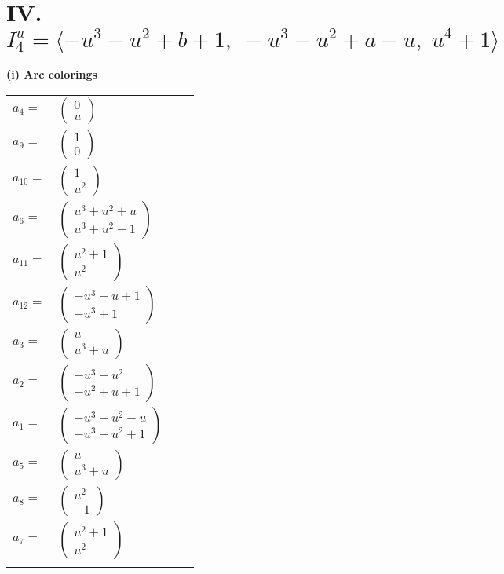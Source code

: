 \documentclass[1p]{elsarticle_modified}
\theoremstyle{definition}
\begin{document}
\centering \section*{IV. $I^u_{4}= \langle - u^3- u^2+b+1,\;- u^3- u^2+a- u,\;u^4+1 \rangle$}
\flushleft \textbf{(i) Arc colorings}\\
\begin{tabular}{m{7pt} m{180pt} m{7pt} m{180pt} }
\flushright $a_{4}=$&$\begin{pmatrix}0\\u\end{pmatrix}$ \\
\flushright $a_{9}=$&$\begin{pmatrix}1\\0\end{pmatrix}$ \\
\flushright $a_{10}=$&$\begin{pmatrix}1\\u^2\end{pmatrix}$ \\
\flushright $a_{6}=$&$\begin{pmatrix}u^3+u^2+u\\u^3+u^2-1\end{pmatrix}$ \\
\flushright $a_{11}=$&$\begin{pmatrix}u^2+1\\u^2\end{pmatrix}$ \\
\flushright $a_{12}=$&$\begin{pmatrix}- u^3- u+1\\- u^3+1\end{pmatrix}$ \\
\flushright $a_{3}=$&$\begin{pmatrix}u\\u^3+u\end{pmatrix}$ \\
\flushright $a_{2}=$&$\begin{pmatrix}- u^3- u^2\\- u^2+u+1\end{pmatrix}$ \\
\flushright $a_{1}=$&$\begin{pmatrix}- u^3- u^2- u\\- u^3- u^2+1\end{pmatrix}$ \\
\flushright $a_{5}=$&$\begin{pmatrix}u\\u^3+u\end{pmatrix}$ \\
\flushright $a_{8}=$&$\begin{pmatrix}u^2\\-1\end{pmatrix}$ \\
\flushright $a_{7}=$&$\begin{pmatrix}u^2+1\\u^2\end{pmatrix}$\\&\end{tabular}
\end{document}
